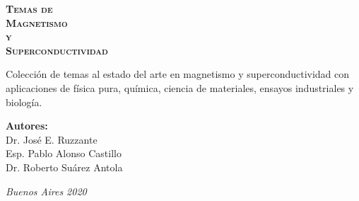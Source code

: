 \documentclass[
11pt, %
spanish,
singlespacing, %
parskip, %
headsepline, %
]{MastersDoctoralThesis} %
\begin{document}
\frontmatter %
\begin{titlepage}
\begin{center}


\vspace{10cm}

{\fontsize{20}{24}\selectfont \textsc{\bfseries Temas de}} 
\vspace{4.0cm} \\ 
{\fontsize{35}{37}\selectfont \textsc{\bfseries Magnetismo }}
\vspace{30px} \\ 
{\fontsize{37}{37}\selectfont \textsc{\bfseries y }}
\vspace{30px}\\ 
{\fontsize{35}{37}\selectfont \textsc{\bfseries Superconductividad }}

\vspace{1.5cm}
Colección de temas al estado del arte en magnetismo y superconductividad con aplicaciones de física pura, química, ciencia de materiales, ensayos industriales y biología. 

\vspace{1.5cm}




\vspace{1.5cm}
\LARGE\textbf{Autores:}\\
Dr. José E. Ruzzante \\ %
Esp. Pablo Alonso Castillo \\ %
Dr. Roberto Suárez Antola \\

\vspace{4.5cm}

\large
 


\textit{Buenos Aires 2020}
\end{center}
\end{titlepage}
\end{document}
